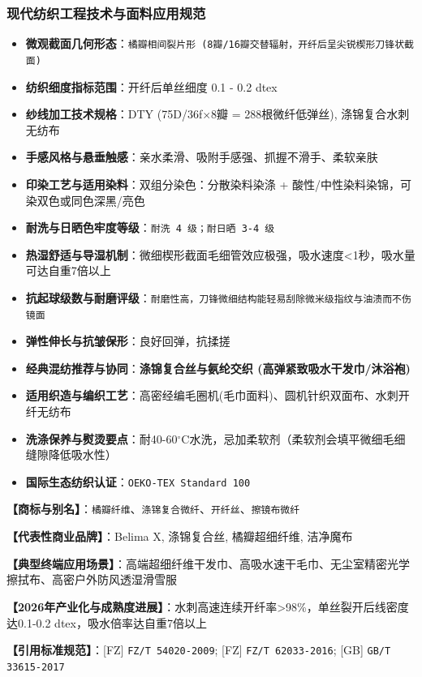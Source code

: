 \documentclass[11pt,openright,twoside,UTF8]{ctexbook}
\begin{document}
\subsubsection*{现代纺织工程技术与面料应用规范}
\begin{itemize} \setlength{\itemsep}{2pt}
    \item \textbf{微观截面几何形态}：\texttt{橘瓣相间裂片形 (8瓣/16瓣交替辐射，开纤后呈尖锐楔形刀锋状截面)}
    \item \textbf{纺织细度指标范围}：开纤后单丝细度 0.1 - 0.2 dtex
    \item \textbf{纱线加工技术规格}：DTY (75D/36f$\times$8瓣 = 288根微纤低弹丝), 涤锦复合水刺无纺布
    \item \textbf{手感风格与悬垂触感}：亲水柔滑、吸附手感强、抓握不滑手、柔软亲肤
    \item \textbf{印染工艺与适用染料}：双组分染色：分散染料染涤 + 酸性/中性染料染锦，可染双色或同色深黑/亮色
    \item \textbf{耐洗与日晒色牢度等级}：\texttt{耐洗 4 级；耐日晒 3-4 级}
    \item \textbf{热湿舒适与导湿机制}：微细楔形截面毛细管效应极强，吸水速度\textless{}1秒，吸水量可达自重7倍以上
    \item \textbf{抗起球级数与耐磨评级}：\texttt{耐磨性高，刀锋微细结构能轻易刮除微米级指纹与油渍而不伤镜面}
    \item \textbf{弹性伸长与抗皱保形}：良好回弹，抗揉搓
    \item \textbf{经典混纺推荐与协同}：\textbf{涤锦复合丝与氨纶交织 (高弹紧致吸水干发巾/沐浴袍)}
    \item \textbf{适用织造与编织工艺}：高密经编毛圈机(毛巾面料)、圆机针织双面布、水刺开纤无纺布
    \item \textbf{洗涤保养与熨烫要点}：耐40-60$^\circ\mathrm{C}$水洗，忌加柔软剂（柔软剂会填平微细毛细缝隙降低吸水性）
    \item \textbf{国际生态纺织认证}：\texttt{OEKO-TEX Standard 100}
\end{itemize}
\vspace{0.2cm}

\noindent\textbf{【商标与别名】}：\texttt{橘瓣纤维}、\texttt{涤锦复合微纤}、\texttt{开纤丝}、\texttt{擦镜布微纤}\par
\noindent\textbf{【代表性商业品牌】}：Belima X, 涤锦复合丝, 橘瓣超细纤维, 洁净魔布\par
\noindent\textbf{【典型终端应用场景】}：高端超细纤维干发巾、高吸水速干毛巾、无尘室精密光学擦拭布、高密户外防风透湿滑雪服\par
\noindent\textbf{【2026年产业化与成熟度进展】}：水刺高速连续开纤率\textgreater{}98\%，单丝裂开后线密度达0.1-0.2 dtex，吸水倍率达自重7倍以上\par
\noindent\textbf{【引用标准规范】}：[FZ] \texttt{FZ/T 54020-2009}; [FZ] \texttt{FZ/T 62033-2016}; [GB] \texttt{GB/T 33615-2017}\par
\vspace{0.5cm}
\end{document}
